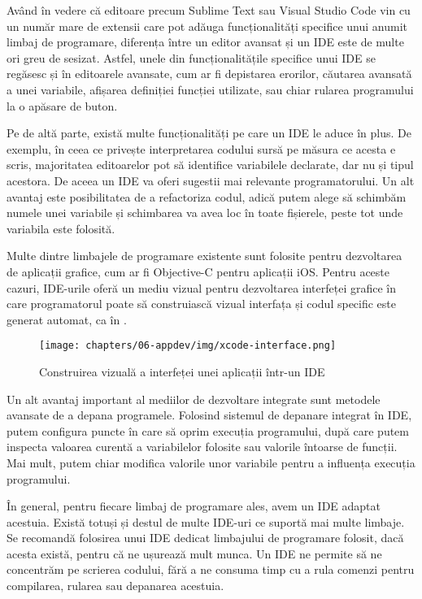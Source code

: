 Având în vedere că editoare precum Sublime Text sau Visual Studio Code vin cu un
număr mare de extensii care pot adăuga funcționalități specifice unui anumit
limbaj de programare, diferența între un editor avansat și un IDE este de multe
ori greu de sesizat. Astfel, unele din funcționalitățile specifice unui IDE se
regăsesc și în editoarele avansate, cum ar fi depistarea erorilor, căutarea
avansată a unei variabile, afișarea definiției funcției utilizate, sau chiar
rularea programului la o apăsare de buton.

Pe de altă parte, există multe funcționalități pe care un IDE le aduce în plus.
De exemplu, în ceea ce privește interpretarea codului sursă pe măsura ce acesta
e scris, majoritatea editoarelor pot să identifice variabilele declarate, dar nu
și tipul acestora. De aceea un IDE va oferi sugestii mai relevante
programatorului. Un alt avantaj este posibilitatea de a refactoriza codul, adică
putem alege să schimbăm numele unei variabile și schimbarea va avea loc în toate
fișierele, peste tot unde variabila este folosită.

Multe dintre limbajele de programare existente sunt folosite pentru dezvoltarea de
aplicații grafice, cum ar fi Objective-C pentru aplicații iOS. Pentru aceste
cazuri, IDE-urile oferă un mediu vizual pentru dezvoltarea interfeței grafice în
care programatorul poate să construiască vizual interfața și codul specific este
generat automat, ca în .

\begin{figure}[!htbp]
  \centering
  \texttt{[image: chapters/06-appdev/img/xcode-interface.png]}
  \caption{Construirea vizuală a interfeței unei aplicații într-un IDE}
  \label{fig:appdev:gui-interface}
\end{figure}

Un alt avantaj important al mediilor de dezvoltare integrate sunt metodele
avansate de a depana programele. Folosind sistemul de depanare integrat în IDE,
putem configura puncte în care să oprim execuția programului, după care putem
inspecta valoarea curentă a variabilelor folosite sau valorile întoarse de
funcții. Mai mult, putem chiar modifica valorile unor variabile pentru a
influența execuția programului.

În general, pentru fiecare limbaj de programare ales, avem un IDE adaptat
acestuia. Există totuși și destul de multe IDE-uri ce suportă mai multe limbaje.
Se recomandă folosirea unui IDE dedicat limbajului de programare folosit, dacă
acesta există, pentru că ne ușurează mult munca. Un IDE ne permite să ne
concentrăm pe scrierea codului, fără a ne consuma timp cu a rula comenzi pentru
compilarea, rularea sau depanarea acestuia.

